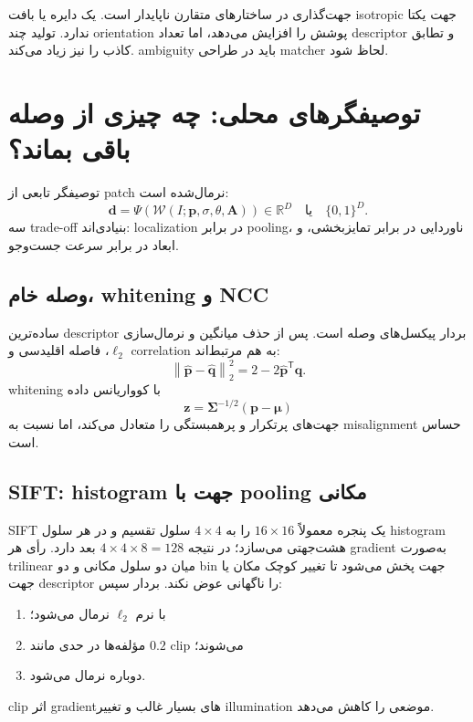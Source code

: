 \documentclass[12pt,openany,oneside]{book}
\newcommand{\R}{\mathbb{R}}
\newcommand{\norm}[1]{\left\lVert #1\right\rVert}
\newcommand{\trans}{^{\mathsf T}}
\newcommand{\vect}[1]{\bm{#1}}
\newcommand{\mat}[1]{\bm{#1}}
\begin{document}
\begin{warningbox}
جهت‌گذاری در ساختارهای متقارن ناپایدار است. یک دایره یا بافت isotropic جهت یکتا ندارد. تولید چند orientation پوشش را افزایش می‌دهد،
اما تعداد descriptor و تطابق کاذب را نیز زیاد می‌کند. ambiguity باید در طراحی matcher لحاظ شود.
\end{warningbox}

\section{توصیفگرهای محلی: چه چیزی از وصله باقی بماند؟}
توصیفگر تابعی از patch نرمال‌شده است:
\begin{equation}
\vect d=\Psi\!\left(\mathcal W(I;\vect p,\sigma,\theta,\mat A)\right)\in\R^D
\quad\text{یا}\quad \{0,1\}^D.
\end{equation}
سه trade-off بنیادی‌اند: localization در برابر pooling، ناوردایی در برابر تمایزبخشی، و ابعاد در برابر سرعت جست‌وجو.

\subsection{وصله خام، whitening و NCC}
ساده‌ترین descriptor بردار پیکسل‌های وصله است. پس از حذف میانگین و نرمال‌سازی $\ell_2$، فاصله اقلیدسی و correlation به هم مرتبط‌اند:
\begin{equation}
\norm{\widehat{\vect p}-\widehat{\vect q}}_2^2
=2-2\widehat{\vect p}\trans\widehat{\vect q}.
\end{equation}
whitening با کوواریانس داده
\begin{equation}
\vect z=\mat\Sigma^{-1/2}(\vect p-\vect\mu)
\end{equation}
جهت‌های پرتکرار و پرهمبستگی را متعادل می‌کند، اما نسبت به misalignment حساس است.

\subsection{SIFT: histogram جهت با pooling مکانی}
SIFT یک پنجره معمولاً $16\times16$ را به $4\times4$ سلول تقسیم و در هر سلول histogram هشت‌جهتی می‌سازد؛ در نتیجه
$4\times4\times8=128$ بعد دارد. رأی هر gradient به‌صورت trilinear میان دو سلول مکانی و دو bin جهت پخش می‌شود تا تغییر کوچک مکان
یا جهت descriptor را ناگهانی عوض نکند. بردار سپس:
\begin{enumerate}
\item با نرم $\ell_2$ نرمال می‌شود؛
\item مؤلفه‌ها در حدی مانند $0.2$ clip می‌شوند؛
\item دوباره نرمال می‌شود.
\end{enumerate}
clip اثر gradientهای بسیار غالب و تغییر illumination موضعی را کاهش می‌دهد.
\end{document}

